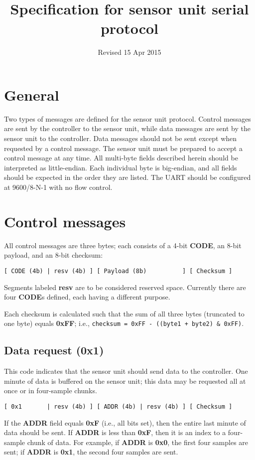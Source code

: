 \documentclass[11pt]{article}
\title{\textbf{Specification for sensor unit serial protocol}}
\date{\vspace{-24pt} Revised 15 Apr 2015}
\begin{document}
\maketitle

\parskip   0pt

\section{General}
Two types of messages are defined for the sensor unit protocol. Control messages are sent by the controller to the sensor unit, while data messages are sent by the sensor unit to the controller. Data messages should not be sent except when requested by a control message. The sensor unit must be prepared to accept a control message at any time. All multi-byte fields described herein should be interpreted as little-endian. Each individual byte is big-endian, and all fields should be expected in the order they are listed. The UART should be configured at 9600/8-N-1 with no flow control.

\section{Control messages}
All control messages are three bytes; each consists of a 4-bit \textbf{CODE}, an 8-bit payload, and an 8-bit checksum:
\begin{verbatim}
[ CODE (4b) | resv (4b) ] [ Payload (8b)          ] [ Checksum ]
\end{verbatim}
Segments labeled \textbf{resv} are to be considered reserved space. Currently there are four \textbf{CODE}s defined, each having a different purpose.

Each checksum is calculated such that the sum of all three bytes (truncated to one byte) equals \textbf{0xFF}; i.e., \texttt{checksum = 0xFF - ((byte1 + byte2) \& 0xFF)}.

\subsection{Data request (0x1)}
This code indicates that the sensor unit should send data to the controller. One minute of data is buffered on the sensor unit; this data may be 		requested all at once or in four-sample chunks.
\begin{verbatim}
[ 0x1       | resv (4b) ] [ ADDR (4b) | resv (4b) ] [ Checksum ]
\end{verbatim}
If the \textbf{ADDR} field equals \textbf{0xF} (i.e., all bits set), then the entire last minute of data should be sent. If \textbf{ADDR} is less than \textbf{0xF}, then it is an index to a four-sample chunk of data. For example, if \textbf{ADDR} is \textbf{0x0}, the first four samples are sent; if \textbf{ADDR} is \textbf{0x1}, the second four samples are sent.
\end{document}
